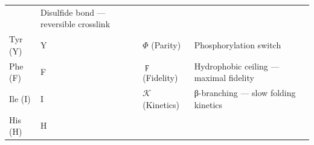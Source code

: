 \begin{longtable}[]{@{}llll@{}}
\begin{minipage}[t]{0.36\columnwidth}
\end{minipage} & \begin{minipage}[t]{0.15\columnwidth}\raggedright
Disulfide bond --- reversible crosslink\strut
\end{minipage}\tabularnewline
\begin{minipage}[t]{0.20\columnwidth}\raggedright
Tyr (Y)\strut
\end{minipage} & \begin{minipage}[t]{0.17\columnwidth}\raggedright
Y\strut
\end{minipage} & \begin{minipage}[t]{0.36\columnwidth}\raggedright
\(\Phi\) (Parity)\strut
\end{minipage} & \begin{minipage}[t]{0.15\columnwidth}\raggedright
Phosphorylation switch\strut
\end{minipage}\tabularnewline
\begin{minipage}[t]{0.20\columnwidth}\raggedright
Phe (F)\strut
\end{minipage} & \begin{minipage}[t]{0.17\columnwidth}\raggedright
F\strut
\end{minipage} & \begin{minipage}[t]{0.36\columnwidth}\raggedright
\(\digamma\) (Fidelity)\strut
\end{minipage} & \begin{minipage}[t]{0.15\columnwidth}\raggedright
Hydrophobic ceiling --- maximal fidelity\strut
\end{minipage}\tabularnewline
\begin{minipage}[t]{0.20\columnwidth}\raggedright
Ile (I)\strut
\end{minipage} & \begin{minipage}[t]{0.17\columnwidth}\raggedright
I\strut
\end{minipage} & \begin{minipage}[t]{0.36\columnwidth}\raggedright
\(\mathcal{K}\) (Kinetics)\strut
\end{minipage} & \begin{minipage}[t]{0.15\columnwidth}\raggedright
β-branching --- slow folding kinetics\strut
\end{minipage}\tabularnewline
\begin{minipage}[t]{0.20\columnwidth}\raggedright
His (H)\strut
\end{minipage} & \begin{minipage}[t]{0.17\columnwidth}\raggedright
H\strut
\end{minipage} & \begin{minipage}[t]{0.36\columnwidth}\raggedright

\end{minipage}
\end{longtable}
